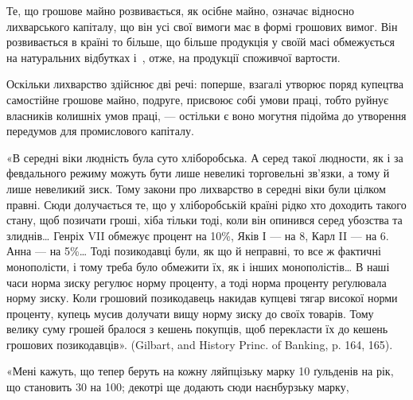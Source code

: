 Те, що грошове майно розвивається, як осібне майно, означає відносно
лихварського капіталу, що він усі свої вимоги має в формі грошових вимог.
Він розвивається в країні то більше, що більше продукція у своїй масі обмежується
на натуральних відбутках і~, отже, на продукції споживчої вартости.

Оскільки лихварство здійснює дві речі: поперше, взагалі утворює поряд
купецтва самостійне грошове майно, подруге, присвоює собі умови праці, тобто
руйнує власників колишніх умов праці, — остільки є воно могутня підойма до
утворення передумов для промислового капіталу.

\begin{center}
\end{center}

«В середні віки людність була суто хліборобська. А серед такої людности,
як і за февдального режиму можуть бути лише невеликі торговельні зв’язки, а
тому й лише невеликий зиск. Тому закони про лихварство в середні віки були
цілком правні. Сюди долучається те, що у хліборобській країні рідко хто доходить
такого стану, щоб позичати гроші, хіба тільки тоді, коли він опинився
серед убозства та злиднів\dots{} Генріх VII обмежує процент на 10\%, Яків І —
на 8, Карл II — на 6. Анна — на 5\%\dots{} Тоді позикодавці були, як що й неправні,
то все ж фактичні монополісти, і тому треба було обмежити їх, як і інших монополістів\dots{}
В наші часи норма зиску регулює норму проценту, а тоді норма проценту
реґулювала норму зиску. Коли грошовий позикодавець накидав купцеві тягар високої
норми проценту, купець мусив долучати вищу норму зиску до своїх товарів.
Тому велику суму грошей бралося з кешень покупців, щоб перекласти їх до кешень
грошових позикодавців». (Gilbart, and History Princ. of Banking, p. 164, 165).

«Мені кажуть, що тепер беруть на кожну ляйпцізьку марку 10 ґульденів
на рік, що становить 30 на 100; декотрі ще додають сюди наєнбурзьку марку,
\parbreak{}  %
